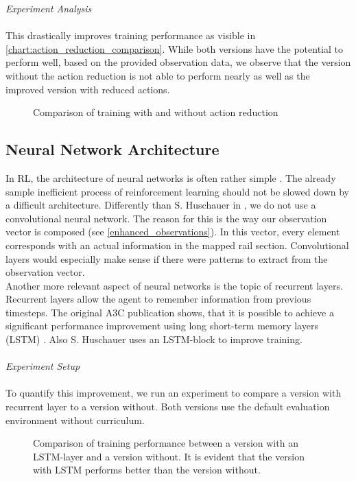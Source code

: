 \textit{Experiment Analysis}\\\\
This drastically improves training performance as visible in \autoref{chart:action_reduction_comparison}. While both versions have the potential to perform well, based on the provided observation data, we observe that the version without the action reduction is not able to perform nearly as well as the improved version with reduced actions.
\begin{figure}[H]
	\begin{center}
		
	\end{center}
	\caption{Comparison of training with and without action reduction}
	\label{chart:action_reduction_comparison}
\end{figure}
\subsection*{Neural Network Architecture}\label{network_architecture}
In RL, the architecture of neural networks is often rather simple \cite{mnih2013playing,a3c}. The already sample inefficient process of reinforcement learning should not be slowed down by a difficult architecture. Differently than S. Huschauer in \cite{flatlandstephan}, we do not use a convolutional neural network. The reason for this is the way our observation vector is composed (see \autoref{enhanced_observations}). In this vector, every element corresponds with an actual information in the mapped rail section. Convolutional layers would especially make sense if there were patterns to extract from the observation vector.\\
Another more relevant aspect of neural networks is the topic of recurrent layers. Recurrent layers allow the agent to remember information from previous timesteps. The original A3C publication shows, that it is possible to achieve a significant performance improvement using long short-term memory layers (LSTM) \cite{a3c}. Also S. Huschauer uses an LSTM-block to improve training.\\\\
\textit{Experiment Setup}\\\\
To quantify this improvement, we run an experiment to compare a version with recurrent layer to a version without. Both versions use the default evaluation environment without curriculum.
\begin{figure}[H]
	\begin{center}
		
	\end{center}
	\caption{Comparison of training performance between a version with an LSTM-layer and a version without. It is evident that the version with LSTM performs better than the version without.}
	\label{chart:lstm_comparison}
\end{figure}

